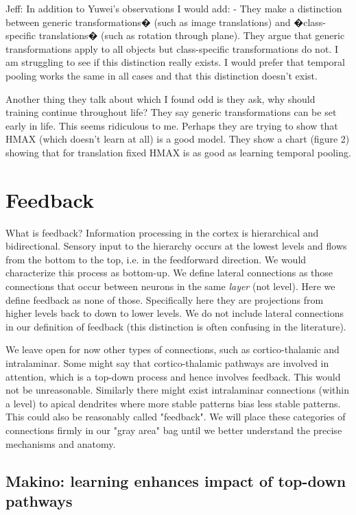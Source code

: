 \documentclass{article} %
\begin{document}
Jeff:  In addition to Yuwei's observations I would add:  - They make a
distinction between generic transformations� (such as image translations) and
�class-specific translations� (such as rotation through plane).  They argue that
generic transformations apply to all objects but class-specific transformations
do not.  I am struggling to see if this distinction really exists.  I would
prefer that temporal pooling works the same in all cases and that this
distinction doesn't exist.


Another thing they talk about which I found odd is they ask, why should
training continue throughout life?  They say generic transformations can be set
early in life.  This seems ridiculous to me.  Perhaps they are trying to show
that HMAX (which doesn't learn at all) is a good model.  They show a chart
(figure 2) showing that for translation fixed HMAX is as good as learning
temporal pooling.

\section{Feedback}

What is feedback? Information processing in the cortex is hierarchical and
bidirectional. Sensory input to the hierarchy occurs at the lowest levels and
flows from the bottom to the top, i.e. in the feedforward direction. We would
characterize this process as bottom-up. We define lateral connections as those
connections that occur between neurons in the same \emph{layer} (not level). Here
we define feedback as none of those. Specifically here they are projections from
higher levels back to down to lower levels. We do not include
lateral connections in our definition of feedback (this distinction is often
confusing in the literature).

We leave open for now other types of connections, such as cortico-thalamic and
intralaminar.  Some might say that cortico-thalamic pathways are involved in
attention, which is a top-down process and hence involves feedback. This would
not be unreasonable. Similarly there might exist intralaminar connections
(within a level) to apical dendrites where more stable patterns bias less stable
patterns. This could also be reasonably called "feedback". We will place these
categories of connections firmly in our "gray area" bag until we better
understand the precise mechanisms and anatomy.

\subsection{Makino: learning enhances impact of top-down pathways}
\end{document}
